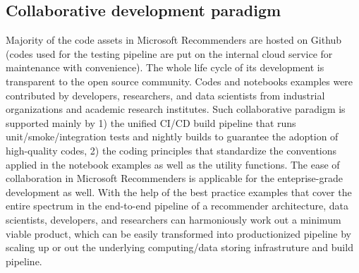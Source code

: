 \subsection{Collaborative development paradigm} %
Majority of the code assets in Microsoft Recommenders are hosted on Github (codes used for the testing pipeline are put on the internal cloud service for maintenance with convenience). The whole life cycle of its development is transparent to the open source community. Codes and notebooks examples were contributed by developers, researchers, and data scientists from industrial organizations and academic research institutes. Such collaborative paradigm is supported mainly by 1) the unified CI/CD build pipeline that runs unit/smoke/integration tests and nightly builds to guarantee the adoption of high-quality codes, 2) the coding principles that standardize the conventions applied in the notebook examples as well as the utility functions. The ease of collaboration in Microsoft Recommenders is applicable for the enteprise-grade development as well. With the help of the best practice examples that cover the entire spectrum in the end-to-end pipeline of a recommender architecture, data scientists, developers, and researchers can harmoniously work out a minimum viable product, which can be easily transformed into productionized pipeline by scaling up or out the underlying computing/data storing infrastruture and build pipeline. 